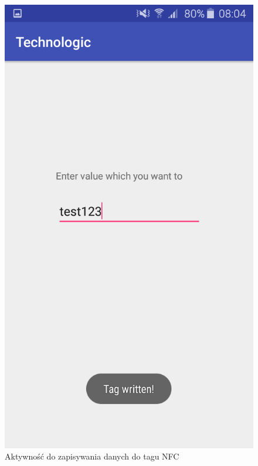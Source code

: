\begin{figure}[H]
    \centering
    \includegraphics[scale=0.22]{imgs/write.png}
    \caption{Aktywność do zapisywania danych do tagu NFC}
\end{figure}
